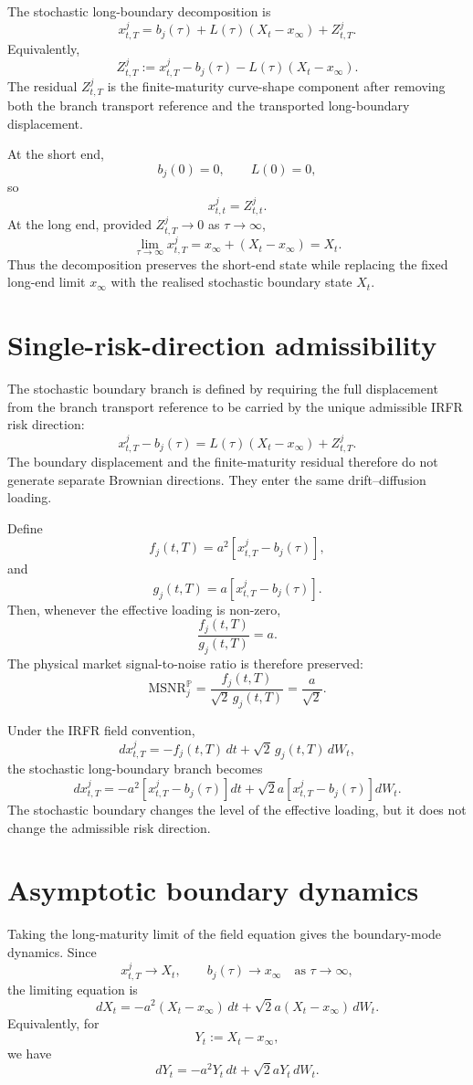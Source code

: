 \documentclass[11pt,oneside]{book}
\begin{document}
The stochastic long-boundary decomposition is
\[
x^j_{t,T}
=
b_j(\tau)
+
L(\tau)(X_t-x_\infty)
+
Z^j_{t,T}.
\]
Equivalently,
\[
Z^j_{t,T}
:=
x^j_{t,T}
-
b_j(\tau)
-
L(\tau)(X_t-x_\infty).
\]
The residual \(Z^j_{t,T}\) is the finite-maturity curve-shape component after removing both the branch transport reference and the transported long-boundary displacement.

At the short end,
\[
b_j(0)=0,
\qquad
L(0)=0,
\]
so
\[
x^j_{t,t}=Z^j_{t,t}.
\]
At the long end, provided \(Z^j_{t,T}\to0\) as \(\tau\to\infty\),
\[
\lim_{\tau\to\infty}x^j_{t,T}
=
x_\infty+(X_t-x_\infty)
=
X_t.
\]
Thus the decomposition preserves the short-end state while replacing the fixed long-end limit \(x_\infty\) with the realised stochastic boundary state \(X_t\).

\section{Single-risk-direction admissibility}

The stochastic boundary branch is defined by requiring the full displacement from the branch transport reference to be carried by the unique admissible IRFR risk direction:
\[
x^j_{t,T}-b_j(\tau)
=
L(\tau)(X_t-x_\infty)+Z^j_{t,T}.
\]
The boundary displacement and the finite-maturity residual therefore do not generate separate Brownian directions. They enter the same drift--diffusion loading.

Define
\[
f_j(t,T)
=
a^2\left[x^j_{t,T}-b_j(\tau)\right],
\]
and
\[
g_j(t,T)
=
a\left[x^j_{t,T}-b_j(\tau)\right].
\]
Then, whenever the effective loading is non-zero,
\[
\frac{f_j(t,T)}{g_j(t,T)}
=
a.
\]
The physical market signal-to-noise ratio is therefore preserved:
\[
\mathrm{MSNR}^{\mathbb P}_j
=
\frac{f_j(t,T)}{\sqrt{2}\,g_j(t,T)}
=
\frac{a}{\sqrt{2}}.
\]

Under the IRFR field convention,
\[
dx^j_{t,T}
=
-f_j(t,T)\,dt
+
\sqrt{2}\,g_j(t,T)\,dW_t,
\]
the stochastic long-boundary branch becomes
\[
dx^j_{t,T}
=
-a^2\left[x^j_{t,T}-b_j(\tau)\right]dt
+
\sqrt{2}a\left[x^j_{t,T}-b_j(\tau)\right]dW_t.
\]
The stochastic boundary changes the level of the effective loading, but it does not change the admissible risk direction.

\section{Asymptotic boundary dynamics}

Taking the long-maturity limit of the field equation gives the boundary-mode dynamics. Since
\[
x^j_{t,T}\to X_t,
\qquad
b_j(\tau)\to x_\infty
\quad
\text{as }\tau\to\infty,
\]
the limiting equation is
\[
dX_t
=
-a^2(X_t-x_\infty)\,dt
+
\sqrt{2}a(X_t-x_\infty)\,dW_t.
\]
Equivalently, for
\[
Y_t:=X_t-x_\infty,
\]
we have
\[
dY_t
=
-a^2Y_t\,dt
+
\sqrt{2}aY_t\,dW_t.
\]
\end{document}
